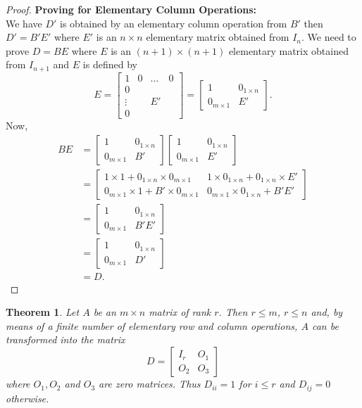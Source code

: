 \documentclass[12pt, a4paper]{article}
\newtheorem{theorem}{Theorem}[section]
\theoremstyle{definition}
\theoremstyle{remark}
\begin{document}
\begin{proof}
\noindent\textbf{Proving for Elementary Column Operations:}\\
We have $D'$ is obtained by an elementary column operation from $B'$ then $D' = B'E'$ where $E'$ is an $n \times n$ elementary matrix obtained from $I_n$. We need to prove $D = BE$ where $E$ is an $(n+1) \times (n+1)$ elementary matrix obtained from $I_{n+1}$ and $E$ is defined by
\[
E = \left[
\begin{array}{c|ccc}
1 & 0 & \dots & 0 \\ \hline
0 &   &       &   \\
\vdots & & E'    &   \\
0 &   &       &   
\end{array}
\right] = \begin{bmatrix} 1 & 0_{1 \times n} \\ 0_{m \times 1} & E' \end{bmatrix}.
\]
Now,
\begin{align*}
BE &= \begin{bmatrix} 1 & 0_{1 \times n} \\ 0_{m \times 1} & B' \end{bmatrix} \begin{bmatrix} 1 & 0_{1 \times n} \\ 0_{m \times 1} & E' \end{bmatrix} \\
&= \begin{bmatrix} 1 \times 1 + 0_{1 \times n} \times 0_{m \times 1} & 1 \times 0_{1 \times n} + 0_{1 \times n} \times E' \\ 0_{m \times 1} \times 1 + B' \times 0_{m \times 1} & 0_{m \times 1} \times 0_{1 \times n} + B'E' \end{bmatrix} \\
&= \begin{bmatrix} 1 & 0_{1 \times n} \\ 0_{m \times 1} & B'E' \end{bmatrix} \\
&= \begin{bmatrix} 1 & 0_{1 \times n} \\ 0_{m \times 1} & D' \end{bmatrix} \\
&= D.
\end{align*}
\end{proof}

\begin{theorem}
Let $A$ be an $m \times n$ matrix of rank $r$. Then $r \le m$, $r \le n$ and, by means of a finite number of elementary row and column operations, $A$ can be transformed into the matrix
\[
D = \begin{bmatrix} I_r & O_1 \\ O_2 & O_3 \end{bmatrix}
\]
where $O_1, O_2$ and $O_3$ are zero matrices. Thus $D_{ii} = 1$ for $i \le r$ and $D_{ij} = 0$ otherwise.
\end{theorem}
\end{document}
